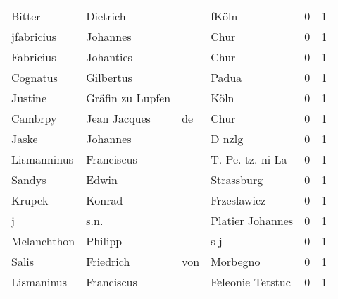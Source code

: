 \documentclass[10pt,a4paper,landscape]{article}
\begin{document}
\begin{longtable}{llllrr}
                   Bitter &                           Dietrich &             &                                       fKöln &          0 &         1 \\
               jfabricius &                           Johannes &             &                                        Chur &          0 &         1 \\
                Fabricius &                          Johanties &             &                                        Chur &          0 &         1 \\
                 Cognatus &                          Gilbertus &             &                                       Padua &          0 &         1 \\
                  Justine &                   Gräfin zu Lupfen &             &                                        Köln &          0 &         1 \\
                  Cambrpy &                       Jean Jacques &          de &                                        Chur &          0 &         1 \\
                    Jaske &                           Johannes &             &                                      D nzlg &          0 &         1 \\
              Lismanninus &                         Franciscus &             &                            T. Pe. tz. ni La &          0 &         1 \\
                   Sandys &                              Edwin &             &                                  Strassburg &          0 &         1 \\
                   Krupek &                             Konrad &             &                                 Frzeslawicz &          0 &         1 \\
                        j &                               s.n. &             &                            Platier Johannes &          0 &         1 \\
              Melanchthon &                            Philipp &             &                                         s j &          0 &         1 \\
                    Salis &                          Friedrich &         von &                                    Morbegno &          0 &         1 \\
               Lismaninus &                         Franciscus &             &                            Feleonie Tetstuc &          0 &         1 \\

\end{longtable}
\end{document}
